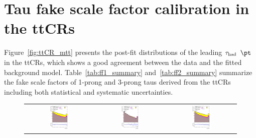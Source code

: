 \section{Tau fake scale factor calibration in the ttCRs}
\label{sec:tauFF_appendix}

Figure~\ref{fig:ttCR_mtt} presents the post-fit distributions of the leading $\thad$ $\pt$ in the ttCRs, which shows a good agreement between the data and the fitted background model.
Table~\ref{tab:ff1_summary} and~\ref{tab:ff2_summary} summarize the fake scale factors of 1-prong and 3-prong taus
derived from the ttCRs including both statistical and systematic uncertainties. 

\begin{figure}[H]
\centering
\begin{tabular}{@{}ccc@{}}
\includegraphics[page=1,width=0.29\textwidth]{figures/ttCR/tuH_reg1l1tau2b2j_os_log_ttCR.pdf} &
\includegraphics[page=1,width=0.29\textwidth]{figures/ttCR/tuH_reg1l1tau2b2j_ss_log_ttCR.pdf}&
\includegraphics[page=1,width=0.29\textwidth]{figures/ttCR/tuH_reg1l1tau2b3j_os_log_ttCR.pdf}\\

\end{tabular}
\end{figure}
